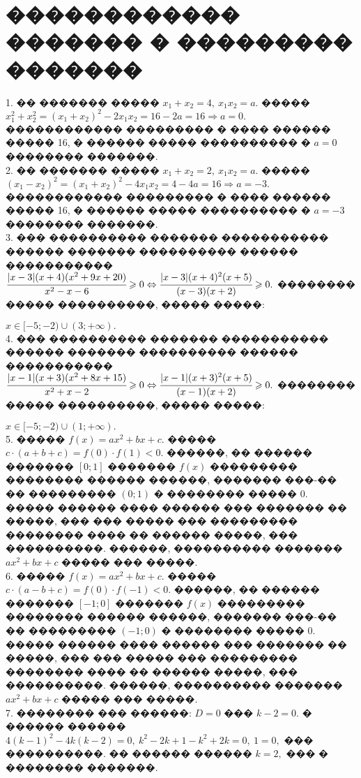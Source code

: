 \documentclass[12pt]{article}
\begin{document}
\section{������������ ������� � ��������� �������}
1. �� ������� ����� $x_1+x_2=4,\ x_1x_2=a.$ ����� $x_1^2+x_2^2=(x_1+x_2)^2-2x_1x_2=16-2a=16\Rightarrow a=0.$ ������������ ��������� � ���� ������ ����� 16, � ������ ����� ���������� � $a=0$ �������� �������.\\
2. �� ������� ����� $x_1+x_2=2,\ x_1x_2=a.$ ����� $(x_1-x_2)^2=(x_1+x_2)^2-4x_1x_2=4-4a=16\Rightarrow a=-3.$ ������������ ��������� � ���� ������ ����� 16, � ������ ����� ���������� � $a=-3$ �������� �������.\\
3. ��� ���������� ������� ����������� ������ ������� ���������� ������ �����������\\ $\cfrac{|x-3|(x+4)(x^2+9x+20)}{x^2-x-6}\geqslant0\Leftrightarrow
\cfrac{|x-3|(x+4)^2(x+5)}{(x-3)(x+2)}\geqslant0.$ �������� ����� ����������, ����� �����:
\begin{figure}[ht!]
\end{figure}
$x\in[-5;-2)\cup(3;+\infty).$\\
4. ��� ���������� ������� ����������� ������ ������� ���������� ������ �����������\\ $\cfrac{|x-1|(x+3)(x^2+8x+15)}{x^2+x-2}\geqslant0\Leftrightarrow
\cfrac{|x-1|(x+3)^2(x+5)}{(x-1)(x+2)}\geqslant0.$ �������� ����� ����������, ����� �����:
\begin{figure}[ht!]
\end{figure}
$x\in[-5;-2)\cup(1;+\infty).$\\
5. ����� $f(x)=ax^2+bx+c.$ ����� $c\cdot(a+b+c)=f(0)\cdot f(1)<0.$ ������, �� ������ ������� $[0;1]$ ������� $f(x)$ ��������� �������� ������ ������, ������� ���-�� �� ��������� $(0;1)$ � �������� ����� 0. ����� ������ ���� ������ ��� ������� �� �����, ��� ��� ����� ��� ��������� �������� ���� �� ������ �����, ��� ����������. ������, ���������� ������� $ax^2+bx+c$ ����� ��� �����.\\
6. ����� $f(x)=ax^2+bx+c.$ ����� $c\cdot(a-b+c)=f(0)\cdot f(-1)<0.$ ������, �� ������ ������� $[-1;0]$ ������� $f(x)$ ��������� �������� ������ ������, ������� ���-�� �� ��������� $(-1;0)$ � �������� ����� 0. ����� ������ ���� ������ ��� ������� �� �����, ��� ��� ����� ��� ��������� �������� ���� �� ������ �����, ��� ����������. ������, ���������� ������� $ax^2+bx+c$ ����� ��� �����.\\
7. �������� ��� ������: $D=0$ ��� $k-2=0.$ � ������ ������ $4(k-1)^2-4k(k-2)=0,\ k^2-2k+1-k^2+2k=0,\ 1=0,$ ��� ����������. �� ������ ������ $k=2,$ ��� � �������� �������.\\
\end{document}
